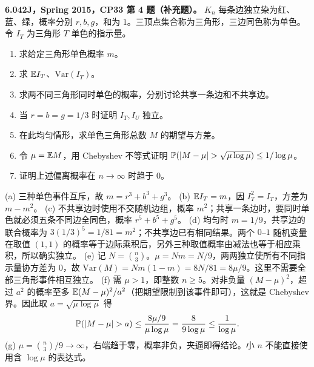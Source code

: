 \begin{exercise}\label{mit:6042-cp33-q4}
\textbf{6.042J，Spring 2015，CP33 第 4 题（补充题）。}
$K_n$ 每条边独立染为红、蓝、绿，概率分别 $r,b,g$，和为 $1$。三顶点集合称为三角形，三边同色称为单色。令 $I_T$ 为三角形 $T$ 单色的指示量。
\begin{enumerate}[label=(\alph*)]
\item 求给定三角形单色概率 $m$。
\item 求 $\mathbb E I_T$、$\mathrm{Var}(I_T)$。
\item 求两不同三角形同时单色的概率，分别讨论共享一条边和不共享边。
\item 当 $r=b=g=1/3$ 时证明 $I_T,I_U$ 独立。
\item 在此均匀情形，求单色三角形总数 $M$ 的期望与方差。
\item 令 $\mu=\mathbb E M$，用 Chebyshev 不等式证明
$\Prob(|M-\mu|>\sqrt{\mu\log\mu})\le1/\log\mu$。
\item 证明上述偏离概率在 $n\to\infty$ 时趋于 $0$。
\end{enumerate}
\end{exercise}
\begin{solution}
(a) 三种单色事件互斥，故 $m=r^3+b^3+g^3$。
(b) $\mathbb E I_T=m$，因 $I_T^2=I_T$，方差为 $m-m^2$。
(c) 不共享边时使用不交随机边组，概率 $m^2$；共享一条边时，要同时单色就必须五条不同边全同色，概率 $r^5+b^5+g^5$。
(d) 均匀时 $m=1/9$，共享边的联合概率为 $3(1/3)^5=1/81=m^2$；不共享边已有相同结果。两个 $0$--$1$ 随机变量在取值 $(1,1)$ 的概率等于边际乘积后，另外三种取值概率由减法也等于相应乘积，所以确实独立。
(e) 记 $N=\binom n3$。$\mu=Nm=N/9$，两两独立使所有不同指示量协方差为 $0$，故 $\mathrm{Var}(M)=Nm(1-m)=8N/81=8\mu/9$。这里不需要全部三角形事件相互独立。
(f) 需 $\mu>1$，即整数 $n\ge5$。对非负量 $(M-\mu)^2$，超过 $a^2$ 的概率至多 $\mathbb E(M-\mu)^2/a^2$（把期望限制到该事件即可），这就是 Chebyshev 界。因此取 $a=\sqrt{\mu\log\mu}$ 得
\[
\Prob(|M-\mu|>a)\le\frac{8\mu/9}{\mu\log\mu}
=\frac8{9\log\mu}\le\frac1{\log\mu}.
\]
(g) $\mu=\binom n3/9\to\infty$，右端趋于零，概率非负，夹逼即得结论。小 $n$ 不能直接使用含 $\log\mu$ 的表达式。
\end{solution}

